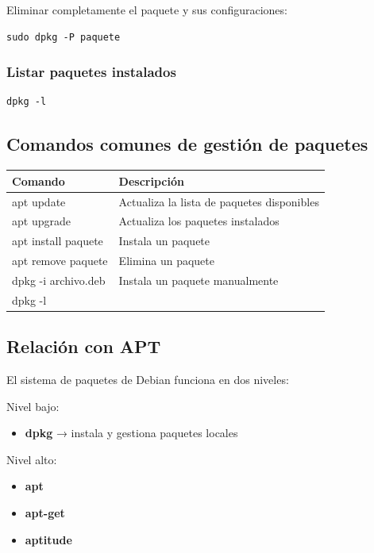 \documentclass[11pt, letterpaper]{article}
\begin{document}
Eliminar completamente el paquete y sus configuraciones:

\begin{verbatim}
sudo dpkg -P paquete
\end{verbatim}
\subsubsection{Listar paquetes instalados}
\label{sec:org41eb4ab}

\begin{verbatim}
dpkg -l
\end{verbatim}
\subsection{Comandos comunes de gestión de paquetes}
\label{sec:org92722ad}

\begin{center}
\begin{tabular}{ll}
Comando & Descripción\\
\hline
apt update & Actualiza la lista de paquetes disponibles\\
apt upgrade & Actualiza los paquetes instalados\\
apt install paquete & Instala un paquete\\
apt remove paquete & Elimina un paquete\\
dpkg -i archivo.deb & Instala un paquete manualmente\\
dpkg -l & \\
\end{tabular}
\end{center}
\subsection{Relación con APT}
\label{sec:org6dff278}

El sistema de paquetes de Debian funciona en dos niveles:

Nivel bajo:
\begin{itemize}
\item \textbf{dpkg} → instala y gestiona paquetes locales
\end{itemize}

Nivel alto:
\begin{itemize}
\item \textbf{apt}
\item \textbf{apt-get}
\item \textbf{aptitude}
\end{itemize}
\end{document}
